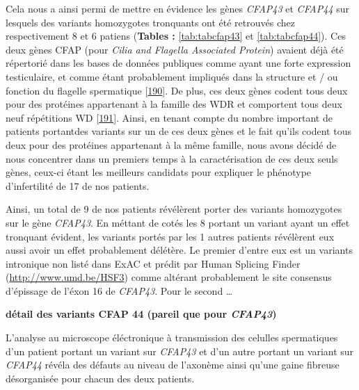 \documentclass[12pt,twoside]{reedthesis}
\theoremstyle{definition}
\theoremstyle{definition}
\theoremstyle{remark}
\begin{document}
  Cela nous a ainsi permi de mettre en évidence les gènes \emph{CFAP43} et
  \emph{CFAP44} sur lesquels des variants homozygotes tronquants ont été
  retrouvés chez respectivement 8 et 6 patiens (\textbf{Tables :
  }\ref{tab:tabcfap43} et \ref{tab:tabcfap44}). Ces deux gènes CFAP (pour
  \emph{Cilia and Flagella Associated Protein}) avaient déjà été
  répertorié dans les bases de données publiques comme ayant une forte
  expression testiculaire, et comme étant probablement impliqués dans la
  structure et / ou fonction du flagelle spermatique
  {[}\protect\hyperlink{ref-Ivliev2012}{190}{]}. De plus, ces deux gènes
  codent tous deux pour des protéines appartenant à la famille des WDR et
  comportent tous deux neuf répétitions WD
  {[}\protect\hyperlink{ref-Smith2008}{191}{]}. Ainsi, en tenant compte du
  nombre important de patients portantdes variants sur un de ces deux
  gènes et le fait qu'ils codent tous deux pour des protéines appartenant
  à la même famille, nous avons décidé de nous concentrer dans un premiers
  temps à la caractérisation de ces deux seuls gènes, ceux-ci étant les
  meilleurs candidats pour expliquer le phénotype d'infertilité de 17 de
  nos patients.
  
  Ainsi, un total de 9 de nos patients révélèrent porter des variants
  homozygotes sur le gène \emph{CFAP43}. En méttant de cotés les 8 portant
  un variant ayant un effet tronquant évident, les variants portés par les
  1 autres patients révélèrent eux aussi avoir un effet probablement
  délétère. Le premier d'entre eux est un variants intronique non listé
  dans ExAC et prédit par Human Splicing Finder
  (\url{http://www.umd.be/HSF3}) comme altérant probablement le site
  consensus d'épissage de l'éxon 16 de \emph{CFAP43}. Pour le second
  \ldots{}
  
  \textbf{détail des variants CFAP 44 (pareil que pour \emph{CFAP43})}
  
  L'analyse au microscope éléctronique à transmission des celulles
  spermatiques d'un patient portant un variant sur \emph{CFAP43} et d'un
  autre portant un variant sur \emph{CFAP44} révéla des défauts au niveau
  de l'axonème ainsi qu'une gaine fibreuse désorganisée pour chacun des
  deux patients.
  
\end{document}

